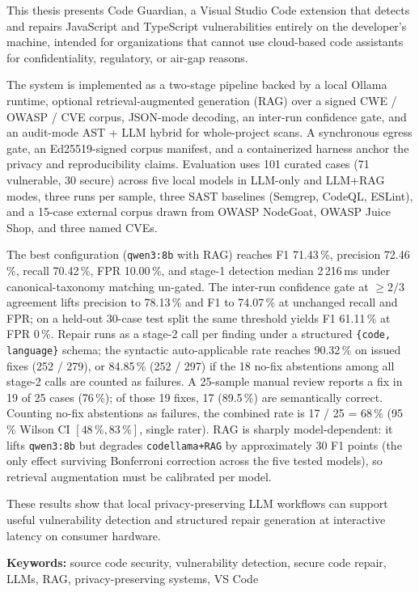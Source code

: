 This thesis presents Code Guardian, a Visual Studio Code extension that detects and repairs JavaScript and TypeScript vulnerabilities entirely on the developer's machine, intended for organizations that cannot use cloud-based code assistants for confidentiality, regulatory, or air-gap reasons.

The system is implemented as a two-stage pipeline backed by a local Ollama runtime, optional retrieval-augmented generation (RAG) over a signed CWE / OWASP / CVE corpus, JSON-mode decoding, an inter-run confidence gate, and an audit-mode AST + LLM hybrid for whole-project scans. A synchronous egress gate, an Ed25519-signed corpus manifest, and a containerized harness anchor the privacy and reproducibility claims. Evaluation uses 101 curated cases (71 vulnerable, 30 secure) across five local models in LLM-only and LLM+RAG modes, three runs per sample, three SAST baselines (Semgrep, CodeQL, ESLint), and a 15-case external corpus drawn from OWASP NodeGoat, OWASP Juice Shop, and three named CVEs.

The best configuration (\texttt{qwen3:8b} with RAG) reaches F1 71.43\,\%, precision 72.46\,\%, recall 70.42\,\%, FPR 10.00\,\%, and stage-1 detection median 2\,216\,ms under canonical-taxonomy matching un-gated. The inter-run confidence gate at $\geq 2/3$ agreement lifts precision to 78.13\,\% and F1 to 74.07\,\% at unchanged recall and FPR; on a held-out 30-case test split the same threshold yields F1 61.11\,\% at FPR 0\,\%. Repair runs as a stage-2 call per finding under a structured \texttt{\{code, language\}} schema; the syntactic auto-applicable rate reaches 90.32\,\% on issued fixes (252 / 279), or 84.85\,\% (252 / 297) if the 18 no-fix abstentions among all stage-2 calls are counted as failures. A 25-sample manual review reports a fix in 19 of 25 cases (76\,\%); of those 19 fixes, 17 (89.5\,\%) are semantically correct. Counting no-fix abstentions as failures, the combined rate is 17 / 25 = 68\,\% (95\,\% Wilson CI $[48\,\%, 83\,\%]$, single rater). RAG is sharply model-dependent: it lifts \texttt{qwen3:8b} but degrades \texttt{codellama+RAG} by approximately 30 F1 points (the only effect surviving Bonferroni correction across the five tested models), so retrieval augmentation must be calibrated per model.

These results show that local privacy-preserving LLM workflows can support useful vulnerability detection and structured repair generation at interactive latency on consumer hardware.

\medskip
\noindent\textbf{Keywords:} source code security, vulnerability detection, secure code repair, LLMs, RAG, privacy-preserving systems, VS Code

